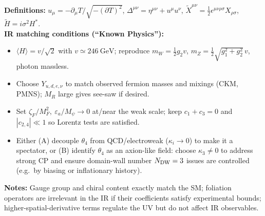 \documentclass[preview]{standalone}
\begin{document}
\textbf{Definitions:} $u_\mu = -\partial_\mu T / \sqrt{-(\partial T)^2}$, $\Delta^{\mu\nu}=\eta^{\mu\nu}+u^\mu u^\nu$, $\tilde X^{\mu\nu}=\tfrac12\epsilon^{\mu\nu\rho\sigma}X_{\rho\sigma}$, $\tilde H = i\sigma^2 H^*$.
\\[6pt]
\textbf{IR matching conditions (``Known Physics''):}
\begin{itemize}
\item $\langle H\rangle = v/\sqrt{2}$ with $v \simeq 246\ \text{GeV}$; reproduce $m_W = \tfrac12 g_2 v$, $m_Z = \tfrac12 \sqrt{g_1^2+g_2^2}\, v$, photon massless.
\item Choose $Y_{u,d,e,\nu}$ to match observed fermion masses and mixings (CKM, PMNS); $M_R$ large gives see-saw if desired.
\item Set $\zeta_F/M_F^2,\ \varepsilon_a/M_\psi \to 0$ at/near the weak scale; keep $c_1{+}c_3\!=\!0$ and $|c_{2,4}|\!\ll\!1$ so Lorentz tests are satisfied.
\item Either (A) decouple $\theta_4$ from QCD/electroweak ($\kappa_i\!\to\!0$) to make it a spectator, or (B) identify $\theta_4$ as an axion-like field: choose $\kappa_3\neq0$ to address strong CP and ensure domain-wall number $N_{\rm DW}=3$ issues are controlled (e.g.\ by biasing or inflationary history).
\end{itemize}
\textbf{Notes:} Gauge group and chiral content exactly match the SM; foliation operators are irrelevant in the IR if their coefficients satisfy experimental bounds; higher-spatial-derivative terms regulate the UV but do not affect IR observables.
\end{document}
